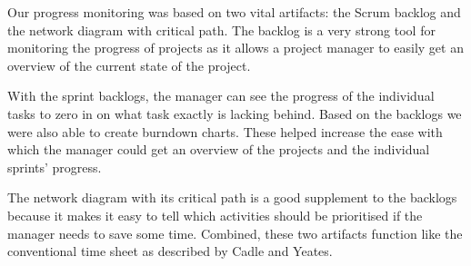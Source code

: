 Our progress monitoring was based on two vital artifacts: the Scrum backlog and the network
diagram with critical path. The backlog is a very strong tool for monitoring the progress
of projects as it allows a project manager to easily get an overview of the current state
of the project.

With the sprint backlogs, the manager can see the progress of the individual tasks to zero
in on what task exactly is lacking behind. Based on the backlogs we were also able to create
burndown charts. These helped increase the ease with which the manager could get an overview
of the projects and the individual sprints' progress.

The network diagram with its critical path is a good supplement to the backlogs because it
makes it easy to tell which activities should be prioritised if the manager needs to save
some time. Combined, these two artifacts function like the conventional time sheet as
described by Cadle and Yeates\cite{caye}.
